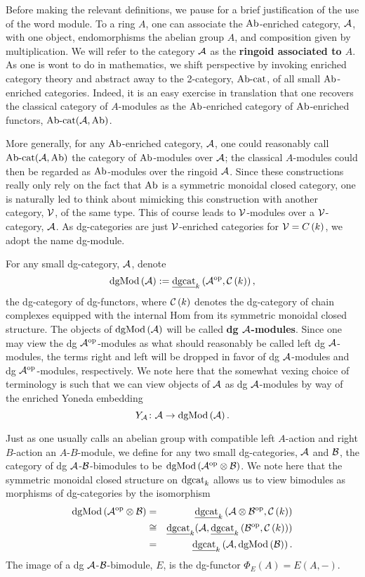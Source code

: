 Before making the relevant definitions, we pause for a brief justification of the use of the word module.
To a ring $A$, one can associate the $\operatorname{Ab}$-enriched category, \(\mathcal{A}\), with one object, endomorphisms the abelian group $A$, and composition given by multiplication.
We will refer to the category $\mathcal{A}$ as the \textbf{ringoid associated to $A$}.
As one is wont to do in mathematics, we shift perspective by invoking enriched category theory and abstract away to the 2-category, $\operatorname{Ab-cat}$, of all small $\operatorname{Ab}$-enriched categories.
Indeed, it is an easy exercise in translation that one recovers the classical category of $A$-modules as the $\operatorname{Ab}$-enriched category of $\operatorname{Ab}$-enriched functors, $\operatorname{Ab-cat}(\mathcal{A}, \operatorname{Ab})$.

More generally, for any $\operatorname{Ab}$-enriched category, $\mathcal{A}$, one could reasonably call $\operatorname{Ab-cat}(\mathcal{A},\operatorname{Ab})$ the category of $\operatorname{Ab}$-modules over $\mathcal{A}$; the classical $A$-modules could then be regarded as $\operatorname{Ab}$-modules over the ringoid $\mathcal{A}$.
Since these constructions really only rely on the fact that $\operatorname{Ab}$ is a symmetric monoidal closed category, one is naturally led to think about mimicking this construction with another category, $\mathcal{V}$, of the same type.
This of course leads to $\mathcal{V}$-modules over a $\mathcal{V}$-category, $\mathcal{A}$.
As dg-categories are just $\mathcal{V}$-enriched categories for $\mathcal{V} = C\left(k\right)$, we adopt the name dg-module.

For any small dg-category, \(\mathcal{A}\), denote
\[\operatorname{dgMod}\left(\mathcal{A}\right) := \underline{\operatorname{dgcat}}_{k}\left(\mathcal{A}^{{\operatorname{op}}},\mathcal{C}\left(k\right)\right),\]
the dg-category of dg-functors, where \(\mathcal{C}\left(k\right)\) denotes the dg-category of chain complexes equipped with the internal Hom from its symmetric monoidal closed structure.
The objects of \(\operatorname{dgMod}\left(\mathcal{A}\right)\) will be called \textbf{dg \(\mathcal{A}\)-modules}.
Since one may view the dg \(\mathcal{A}^{{\operatorname{op}}}\)-modules as what should reasonably be called left dg \(\mathcal{A}\)-modules, the terms right and left will be dropped in favor of dg \(\mathcal{A}\)-modules and dg \(\mathcal{A}^{{\operatorname{op}}}\)-modules, respectively.
We note here that the somewhat vexing choice of terminology is such that we can view objects of \(\mathcal{A}\) as dg \(\mathcal{A}\)-modules by way of the enriched Yoneda embedding
\[Y_{\mathcal{A}} \colon \mathcal{A} \to \operatorname{dgMod}\left(\mathcal{A}\right).\]

Just as one usually calls an abelian group with compatible left $A$-action and right $B$-action an $A$-$B$-module, we define for any two small dg-categories, \(\mathcal{A}\) and \(\mathcal{B}\), the category of dg \(\mathcal{A}\)-\(\mathcal{B}\)-bimodules to be \(\operatorname{dgMod}\left(\mathcal{A}^{{\operatorname{op}}} \otimes \mathcal{B}\right)\).
We note here that the symmetric monoidal closed structure on \(\operatorname{dgcat}_k\) allows us to view bimodules as morphisms of dg-categories by the isomorphism
\begin{eqnarray*}
  \operatorname{dgMod}\left(\mathcal{A}^{{\operatorname{op}}} \otimes \mathcal{B}\right) &=& \underline{\operatorname{dgcat}}_{k}\left(\mathcal{A} \otimes \mathcal{B}^{{\operatorname{op}}}, \mathcal{C}\left(k\right)\right)\\
  &\cong& \underline{\operatorname{dgcat}}_{k}(\mathcal{A}, \underline{\operatorname{dgcat}}_{k}\left(\mathcal{B}^{{\operatorname{op}}}, \mathcal{C}\left(k\right)\right))\\
  &=& \underline{\operatorname{dgcat}}_{k}\left(\mathcal{A}, \operatorname{dgMod}\left(\mathcal{B}\right)\right).
\end{eqnarray*}
The image of a dg \(\mathcal{A}\)-\(\mathcal{B}\)-bimodule, \(E\), is the dg-functor \(\Phi_E(A) = E(A,-)\).


